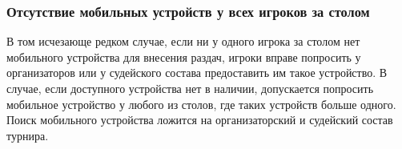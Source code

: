 \subsubsection{Отсутствие мобильных устройств у всех игроков за столом}

В том исчезающе редком случае, если ни у одного игрока за столом нет мобильного устройства для внесения раздач, игроки вправе попросить у организаторов или у судейского состава предоставить им такое устройство. В случае, если доступного устройства нет в наличии, допускается попросить мобильное устройство у любого из столов, где таких устройств больше одного. Поиск мобильного устройства ложится на организаторский и судейский состав турнира.


